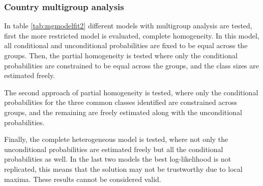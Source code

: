 \documentclass[12pt,a4paper,oneside]{reedthesis}
\begin{document}
\newpage

\hypertarget{country-multigroup-analysis-1}{%
\subsubsection{Country multigroup analysis}\label{country-multigroup-analysis-1}}

In table \ref{tab:mgmodelfit2} different models with multigroup analysis are tested, first the more restricted model is evaluated, complete homogeneity. In this model, all conditional and unconditional probabilities are fixed to be equal across the groups. Then, the partial homogeneity is tested where only the conditional probabilities are constrained to be equal across the groups, and the class sizes are estimated freely.

The second approach of partial homogeneity is tested, where only the conditional probabilities for the three common classes identified are constrained across groups, and the remaining are freely estimated along with the unconditional probabilities.

Finally, the complete heterogeneous model is tested, where not only the unconditional probabilities are estimated freely but all the conditional probabilities as well. In the last two models the best log-likelihood is not replicated, this means that the solution may not be trustworthy due to local maxima. These results cannot be considered valid.
\end{document}
